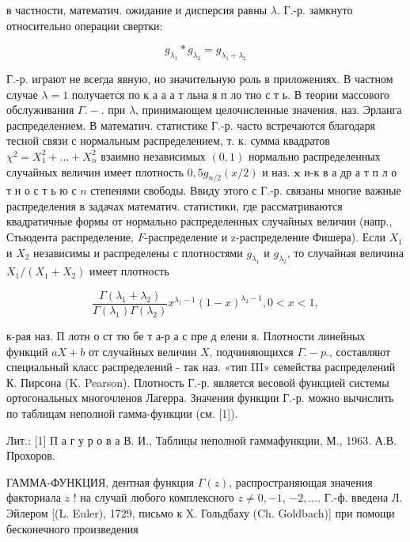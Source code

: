 \documentclass[10pt]{article}
\begin{document}
в частности, математич. ожидание и дисперсия равны $\lambda$. Г.-р. замкнуто относительно операции свертки:



\[

g_{\lambda_{1}} * g_{\lambda_{2}}=g_{\lambda_{1}+\lambda_{2}}

\]



Г.-р. играют не всегда явную, но значительную роль в приложениях. В частном случае $\lambda=1$ получается по к а а а т льна я п ло тно с т ь. В теории массового обслуживания $\Gamma .-$. при $\lambda$, принимающем целочисленные значения, наз. Эрланга распределением. В математич. статистике Г.-р. часто встречаются благодаря тесной связи с нормальным распределением, т. к. сумма квадратов $\chi^{2}=X_{1}^{2}+\ldots+X_{n}^{2}$ взаимно независимых $(0,1)$ нормально распределенных случайных величин имеет плотность $0,5 g_{n / 2}(x / 2)$ и наз. $\mathbf{x}$ и-к в а др а т п л о т н о с т ь ю с $n$ степенями свободы. Ввиду этого с Г.-р. связаны многие важные распределения в задачах математич. статистики, где рассматриваются квадратичные формы от нормально распределенных случайных величин (напр., Стьюдента распределение, $F$-распределение и z-распределение Фишера). Если $X_{1}$ и $X_{2}$ независимы и распределены с плотностями $g_{\lambda_{1}}$ и $g_{\lambda_{2}}$, то случайная величина $X_{1} /\left(X_{1}+X_{2}\right)$ имеет плотность



\[

\frac{\Gamma\left(\lambda_{1}+\lambda_{2}\right)}{\Gamma\left(\lambda_{1}\right) \Gamma\left(\lambda_{2}\right)} x^{\lambda_{1}-1}(1-x)^{\lambda_{2}-1}, 0<x<1,

\]



к-рая наз. П лотн о ст тю бе т а-р а с пре д елени я. Плотности линейных функций $a X+b$ от случайных величин $X$, подчиняющихся $\Gamma .-p .$, составляют специальный класс распределений - так наз. «тип III» семейства распределений К. Пирсона (K. Pearson). Плотность Г.-р. является весовой функцией системы ортогональных многочленов Лагерра. Значения функции Г.-р. можно вычислить по таблицам неполной гамма-функции (см. [1]).



Лит.: [1] П а г у р о в а В. И., Таблицы неполной гаммафункции, М., 1963. А.В. Прохоров.



ГАММА-ФУНКЦИЯ, дентная функция $\Gamma(z)$, распространяющая значения факториала $z$ ! на случай любого комплексного $z \neq 0,-1$, $-2, \ldots$. Г.-ф. введена Л. Эйлером [(L. Euler), 1729, письмо к X. Гольдбаху (Ch. Goldbach)] при помощи бесконечного произведения
\end{document}
